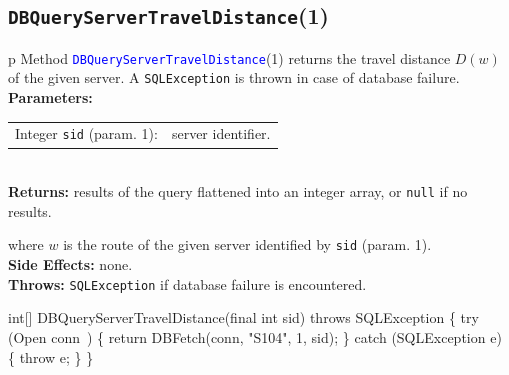 \subsection{\texttt{DBQueryServerTravelDistance}(1)}
\begin{tabular}{p{\textwidth}}
\toprule
{}
Method \textcolor{blue}{{\tt{}\protect{}DBQueryServerTravelDistance}}(1) returns the
travel distance $D(w)$ of the given server.
A {\tt{}SQLException} is thrown in case of database failure.\\
\midrule
\textbf{Parameters:} \\
\begin{tabular}{lp{116mm}}
Integer {\tt{}sid} (param. 1):&server identifier.
\end{tabular}\\
\textbf{Returns:} results of the query flattened into an integer array,
or {\tt{}null} if no results.


where $w$ is the route of the given server identified by {\tt{}sid} (param. 1).\\
\textbf{Side Effects:} none.\\
\textbf{Throws:} {\tt{}SQLException} if database failure is encountered.\\
\bottomrule
\end{tabular}
\nwenddocs{}\endmoddef{}
int[] DBQueryServerTravelDistance(final int sid) throws SQLException \{
  try (\LA{}Open \code{}conn\edoc{}~{\nwtagstyle{}}\RA{}) \{
    return DBFetch(conn, "S104", 1, sid);
  \} catch (SQLException e) \{
    throw e;
  \}
\}
\eatline
{}\nwendcode{}\nwdocspar
